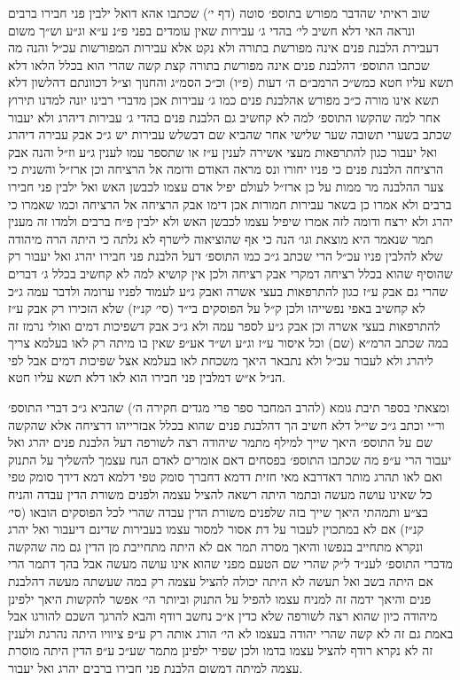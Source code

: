 \documentclass[12pt, openany]{book}
\begin{document}
\begin{multicols}{2}
שוב ראיתי שהדבר מפורש בתוספ׳ סוטה (דף י׳) שכתבו אהא דואל ילבין פני חבירו ברבים ונראה האי דלא חשיב לי׳ בהדי ג׳ עבירות שאין עומדים בפני פ״נ ע״א וג״ע וש״ך משום דעבירת הלבנת פנים אינה מפורשת בתורה ולא נקט אלא עבירות המפורשות עכ״ל והנה מה שכתבו התוספ׳ דהלבנת פנים אינה מפורשת בתורה קצת קשה שהרי הוא בכלל הלאו דלא תשא עליו חטא כמש״כ הרמב״ם ה׳ דעות (פ״ו) וכ״כ הסמ״ג והחנוך וצ״ל דכוונתם דהלשון דלא תשא אינו מורה כ״כ מפורש אהלבנת פנים כמו ג׳ עבירות אכן מדברי רבינו יונה למדנו תירוץ אחר למה שהקשו התוספ׳ למה לא קחשיב גם הלבנת פנים בהדי ג׳ עבירות דיהרג ולא יעבור שכתב בשערי תשובה שער שלישי אחר שהביא שם דבשלש עבירות יש ג״כ אבק עבירה דיהרג ואל יעבור כגון להתרפאות מעצי אשירה לענין ע״ז או שתספר עמו לענין ג״ע וז״ל והנה אבק הרציחה הלבנת פנים כי פניו יחורו ונס מראה האודם ודומה אל הרציחה וכן ארז״ל והשנית כי צער ההלבנה מר ממות על כן ארז״ל לעולם יפיל אדם עצמו לכבשן האש ואל ילבין פני חבירו ברבים ולא אמרו כן בשאר עבירות חמורות אכן דימו אבק הרציחה אל הרציחה וכמו שאמרו כי יהרג ולא ירצח ודומה לזה אמרו שיפיל עצמו לכבשן האש ולא ילבין פ״ח ברבים ולמדו זה מענין תמר שנאמר היא מוצאת וגו׳ הנה כי אף שהוציאוה לישרף לא גלתה כי היתה הרה מיהודה שלא להלבין פניו עכ״ל הרי שכתב ג״כ כמו התוספ׳ דעל הלבנת פני חבירו יהרג ואל יעבור רק שהוסיף שהוא בכלל רציחה דמקרי אבק רציחה ולכן אין קושיא למה לא קחשיב בכלל ג׳ דברים שהרי גם אבק ע״ז כגון להתרפאות בעצי אשרה ואבק ג״ע לעמוד לפניו ערומה ולדבר עמה ג״כ לא קחשיב באפי נפשייהו ולכן ק״ל על הפוסקים בי״ד (סי׳ קנ״ז) שלא הזכירו רק אבק ע״ז להתרפאות בעצי אשרה וכן אבק ג״ע לספר עמה ולא ג״כ אבק דשפיכות דמים ואולי נרמז זה במה שכתב הרמ״א (שם) וכל איסור ע״ז וג״ע וש״ד אע״פ שאין בו מיתה רק לאו בעלמא צריך ליהרג ולא לעבור עכ״ל ולא נתבאר היאך משכחת לאו בעלמא אצל שפיכות דמים אבל לפי הנ״ל א״ש דמלבין פני חבירו הוא לאו דלא תשא עליו חטא.\\\vspace{0pt}

ומצאתי בספר תיבת גומא (להרב המחבר ספר פרי מגדים חקירה ה׳) שהביא ג״כ דברי התוספ׳ ור״י וכתב ג״כ שי״ל דלא חשיב הך דהלבנת פנים שהוא בכלל אבזרייהו דרציחה אלא שהקשה שם על התוספ׳ היאך שייך למילף מתמר שיהודה רצה לשורפה דעל הלבנת פנים יהרג ואל יעבור הרי ע״פ מה שכתבו התוספ׳ בפסחים דאם אומרים לאדם הנח עצמך להשליך על התנוק ואם לאו תהרג מותר דאדרבא מאי חזית דדמא דחברך סומק טפי דלמא דמא דידך סומק טפי כל שאינו עושה מעשה ובתמר היתה רשאה להציל עצמה ולפנים משורת הדין עבדה והניח בצ״ע ותמהתי היאך שייך בזה שלפנים משורת הדין עבדה שהרי לכל הפוסקים הובאו (סי׳ קנ״ז) אם לא במתכוין לעבור על דת אסור למסור עצמו בעבירות שדינם דיעבור ואל יהרג ונקרא מתחייב בנפשו והיאך מסרה תמר אם לא היתה מתחייבת מן הדין גם מה שהקשה מדברי התוספ׳ לענ״ד ל״ק שהרי שם הטעם מפני שהוא אינו עושה מעשה אבל בהך דתמר הרי אם היתה בשב ואל תעשה לא היתה יכולה להציל עצמה רק במה שעשתה מעשה דהלבנת פנים והיאך ידמה זה למניח עצמו להפיל על התנוק וביותר הי׳ אפשר להקשות היאך ילפינן מיהודה כיון שהוא רצה לשורפה שלא כדין א״כ נחשב רודף והבא להרגך השכם להורגו אבל באמת גם זה לא קשה שהרי יהודה בעצמו לא הי׳ הורג אותה רק ע״פ ציוויו היתה נהרגת ולענין זה לא נקרא רודף להציל עצמו בדמו ולכן שפיר ילפינן מתמר שע״כ ע״פ הדין היתה מוסרת עצמה למיתה דמשום הלבנת פני חבירו ברבים יהרג ואל יעבור.\\\vspace{0pt}


\end{multicols}
\end{document}
